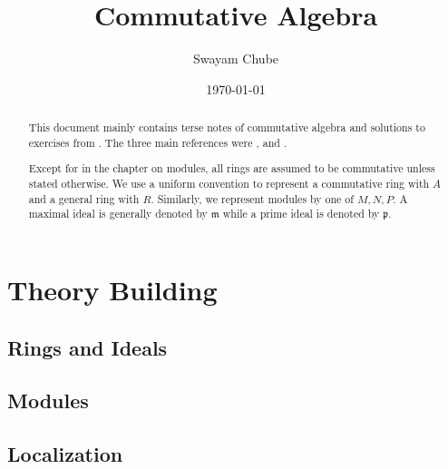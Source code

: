 \documentclass{report}
\title{Commutative Algebra}
\author{Swayam Chube}
\date{\today}
\begin{document}
\maketitle

\begin{abstract}
This document mainly contains terse notes of commutative algebra and solutions to exercises from \cite{atiyah-macdonald}. The three main references were \cite{atiyah-macdonald}, \cite{dummit-foote} and \cite{lang}. 

Except for in the chapter on modules, all rings are assumed to be commutative unless stated otherwise. We use a uniform convention to represent a commutative ring with $A$ and a general ring with $R$. Similarly, we represent modules by one of $M, N, P$. A maximal ideal is generally denoted by $\mathfrak m$ while a prime ideal is denoted by $\mathfrak p$.
\end{abstract}

\tableofcontents


\part{Theory Building}
\chapter{Rings and Ideals}


\chapter{Modules}


\chapter{Localization}


% 



\end{document}
